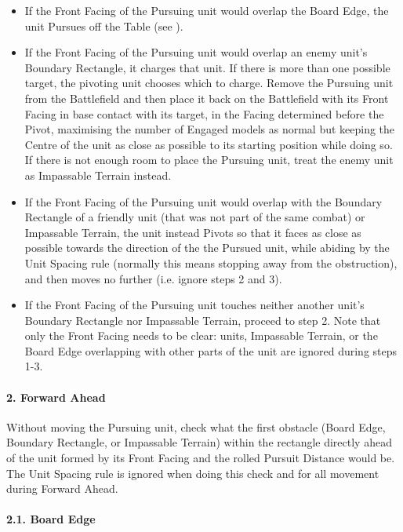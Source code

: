 \begin{itemize}[label={-}]
\item If the Front Facing of the Pursuing unit would overlap the Board Edge, the unit Pursues off the Table (see ).
\item If the Front Facing of the Pursuing unit would overlap an enemy unit's Boundary Rectangle, it charges that unit. If there is more than one possible target, the pivoting unit chooses which to charge.  Remove the Pursuing unit from the Battlefield and then place it back on the Battlefield with its Front Facing in base contact with its target, in the Facing determined before the Pivot, maximising the number of Engaged models as normal but keeping the Centre of the unit as close as possible to its starting position while doing so. If there is not enough room to place the Pursuing unit, treat the enemy unit as Impassable Terrain instead.
\item If the Front Facing of the Pursuing unit would overlap with the Boundary Rectangle of a friendly unit (that was not part of the same combat) or Impassable Terrain, the unit instead Pivots so that it faces as close as possible towards the direction of the the Pursued unit, while abiding by the Unit Spacing rule (normally this means stopping  away from the obstruction), and then moves no further (i.e. ignore steps 2 and 3).
\item If the Front Facing of the Pursuing unit touches neither another unit's Boundary Rectangle nor Impassable Terrain, proceed to step 2. Note that only the Front Facing needs to be clear: units, Impassable Terrain, or the Board Edge overlapping with other parts of the unit are ignored during steps 1-3.
\end{itemize}

\paragraph{2. Forward Ahead}

Without moving the Pursuing unit, check what the first obstacle (Board Edge, Boundary Rectangle, or Impassable Terrain) within the rectangle directly ahead of the unit formed by its Front Facing and the rolled Pursuit Distance would be. The Unit Spacing rule is ignored when doing this check and for all movement during Forward Ahead.

\paragraph{2.1. Board Edge}

